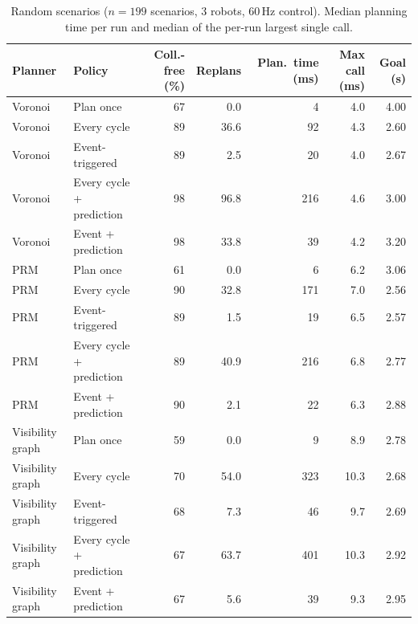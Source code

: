 \begin{table}[t]
\centering
\footnotesize
\caption{Random scenarios ($n=199$ scenarios, 3 robots, 60\,Hz control). Median planning time per run and median of the per-run largest single call.}
\label{tab:random}
\begin{tabular}{llrrrrr}
\hline
Planner & Policy & Coll.-free (\%) & Replans & Plan.\ time (ms) & Max call (ms) & Goal (s) \\
\hline
Voronoi & Plan once & 67 & 0.0 & 4 & 4.0 & 4.00 \\
Voronoi & Every cycle & 89 & 36.6 & 92 & 4.3 & 2.60 \\
Voronoi & Event-triggered & 89 & 2.5 & 20 & 4.0 & 2.67 \\
Voronoi & Every cycle + prediction & 98 & 96.8 & 216 & 4.6 & 3.00 \\
Voronoi & Event + prediction & 98 & 33.8 & 39 & 4.2 & 3.20 \\
PRM & Plan once & 61 & 0.0 & 6 & 6.2 & 3.06 \\
PRM & Every cycle & 90 & 32.8 & 171 & 7.0 & 2.56 \\
PRM & Event-triggered & 89 & 1.5 & 19 & 6.5 & 2.57 \\
PRM & Every cycle + prediction & 89 & 40.9 & 216 & 6.8 & 2.77 \\
PRM & Event + prediction & 90 & 2.1 & 22 & 6.3 & 2.88 \\
Visibility graph & Plan once & 59 & 0.0 & 9 & 8.9 & 2.78 \\
Visibility graph & Every cycle & 70 & 54.0 & 323 & 10.3 & 2.68 \\
Visibility graph & Event-triggered & 68 & 7.3 & 46 & 9.7 & 2.69 \\
Visibility graph & Every cycle + prediction & 67 & 63.7 & 401 & 10.3 & 2.92 \\
Visibility graph & Event + prediction & 67 & 5.6 & 39 & 9.3 & 2.95 \\
\hline
\end{tabular}
\end{table}
